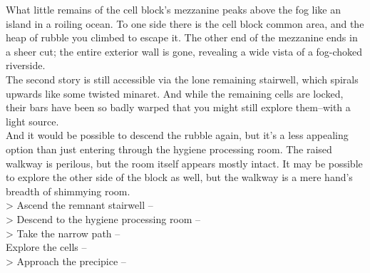 What little remains of the cell block’s mezzanine peaks above the fog like an island in a roiling ocean. To one side there is the cell block common area, and the heap of rubble you climbed to escape it. The other end of the mezzanine ends in a sheer cut; the entire exterior wall is gone, revealing a wide vista of a fog-choked riverside.\\

The second story is still accessible via the lone remaining stairwell, which spirals upwards like some twisted minaret. And while the remaining cells are locked, their bars have been so badly warped that you might still explore them--with a light source.\\

And it would be possible to descend the rubble again, but it’s a less appealing option than just entering through the hygiene processing room. The raised walkway is perilous, but the room itself appears mostly intact. It may be possible to explore the other side of the block as well, but the walkway is a mere hand’s breadth of shimmying room.\\

> Ascend the remnant stairwell -- \\
> Descend to the hygiene processing room -- \\
> Take the narrow path -- \\
 Explore the cells -- \\
> Approach the precipice -- \\
